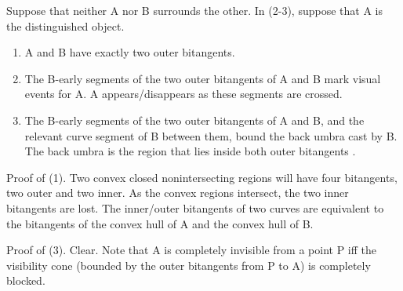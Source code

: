 \documentclass[12pt]{article}
\newif\ifCommentary             %
\begin{document}
\begin{lemma}
\label{lem:twoOuter}
\ifCommentary
Let A and B be closed curves whose interiors have no intersection.
\fi
Suppose that neither A nor B surrounds the other.
In (2-3), suppose that A is the distinguished object.
\begin{enumerate}
\item A and B have exactly two outer bitangents.
\item The B-early segments of the two outer bitangents of A and B mark visual events 
      for A.
      A appears/disappears as these segments are crossed.
\item
\label{lem:localbackumbra}
      The B-early segments of the two outer bitangents of A and B, 
      and the relevant curve segment of B between them,
      bound the back umbra cast by B.
      The back umbra is the region that lies inside both outer bitangents
      \ifCommentary(Figure~\ref{fig:backumbra}).\else.\fi
\end{enumerate}
\end{lemma}
\prf
Proof of (1).
Two convex closed nonintersecting regions will have four bitangents,
two outer and two inner.
As the convex regions intersect, the two inner bitangents are lost. %
The inner/outer bitangents of two curves are equivalent to the bitangents of the
convex hull of A and the convex hull of B.
\ifCommentary (Figure~\ref{fig:outer}a).\fi

Proof of (3).
Clear.
Note that A is completely invisible from a point P iff the visibility cone (bounded
by the outer bitangents from P to A) is completely blocked.
\QED

\ifCommentary
See umbra -P 0 ../data/outPiercingSweep.pts.
\fi

\vspace{.3in}

\ifCommentary
\begin{figure}[h]
\begin{center}
\texttt{[image: img2/umbra1back.jpg]}
\end{center}
\caption{The back umbra of A.}
\label{fig:backumbra}
\end{figure}
\fi
\end{document}
